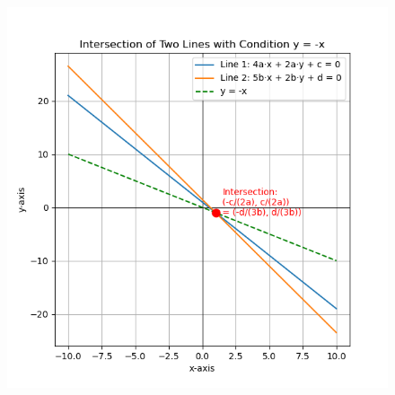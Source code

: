 \documentclass[journal,12pt,onecolumn]{IEEEtran}
\begin{document}
\begin{figure}[h!]
    \centering
    \includegraphics[height=0.5\textheight, keepaspectratio]{figs/fig.png}
    \label{figure_1}
\end{figure}
\end{document}
